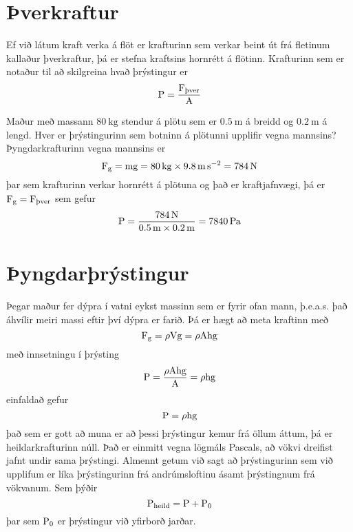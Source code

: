 %
\section{Þverkraftur}
Ef við látum kraft verka á flöt er krafturinn sem verkar beint út frá fletinum kallaður
þverkraftur, þá er stefna kraftsins hornrétt á flötinn. Krafturinn sem er notaður til að
skilgreina hvað þrýstingur er
\begin{equation}
	\text{P} = \frac{\textrm{F}_\text{þver}}{\text{A}}
\end{equation}

\begin{formalexample}
Maður með massann $\SI{80}{\kg}$ stendur á plötu sem er $\SI{0.5}{\m}$ á breidd og
$\SI{0.2}{\m}$ á lengd. Hver er þrýstingurinn sem botninn á 
plötunni upplifir vegna mannsins?
\\[4 ex]
Þyngdarkrafturinn vegna mannsins er
\[
	\uforce_\uacceleg = \umass \uacceleg 
		= \SI{80}{\kg} \times \SI{9.8}{\m\per\s\squared}
		= \SI{784}{\N}
\]
þar sem krafturinn verkar hornrétt á plötuna og það er kraftjafnvægi, þá er 
$\textrm{F}_{\textrm{g}} = \textrm{F}_\text{þver}$ sem gefur
\[
	\upressure = \frac{ \SI{784}{\N} 
			}{ \SI{0.5}{\m} \times \SI{0.2}{\m} }
		= \SI{7840}{\Pa}
\]
\end{formalexample}


\section{Þyngdarþrýstingur}
Þegar maður fer dýpra í vatni eykst massinn sem er fyrir ofan mann, þ.e.a.s. það
áhvílir meiri massi eftir því dýpra er farið. Þá er hægt að meta kraftinn
með
\[
	\textrm{F}_{\textrm{g}} = \rho \text{V} \textrm{g}
		= \rho \text{A} \textrm{h} \textrm{g}
\]
með innsetningu í þrýsting
\[
	\text{P} = \frac{\rho \text{A} \textrm{h} \textrm{g}}{\text{A}}
		= \rho \textrm{h} \textrm{g}
\]
einfaldað gefur
\begin{equation}
	\text{P}
		= \rho \textrm{h} \textrm{g}
\end{equation}
það sem er gott að muna er að þessi þrýstingur kemur frá öllum áttum, þá er
heildarkrafturinn núll. Það er einmitt vegna lögmáls Pascals, að vökvi dreifist
jafnt undir sama þrýstingi. Almennt getum við sagt að þrýstingurinn sem við upplifum
er líka þrýstingurinn frá andrúmsloftinu ásamt þrýstingnum frá vökvanum. Sem þýðir
\[
	\text{P}_\text{heild} = \text{P} + \text{P}_0
\]
þar sem $\text{P}_0$ er þrýstingur við yfirborð jarðar.

